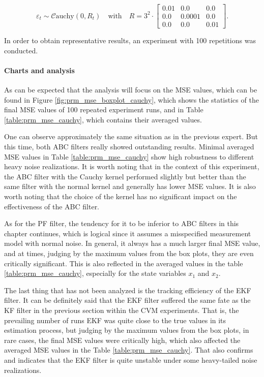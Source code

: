 \begin{equation}
    \varepsilon_t \sim \mathcal{C}\text{auchy}\left(0, R_t\right) \quad \text{with} \quad R =
    3^{2}\cdot
    \begin{bmatrix}
        0.01 & 0.0 & 0.0 \\
        0.0 & 0.0001 & 0.0 \\
        0.0 & 0.0 & 0.01
    \end{bmatrix}.
\end{equation}

In order to obtain representative results, an experiment with 100 repetitions was conducted.

\paragraph*{Charts and analysis}
As can be expected that the analysis will focus on the MSE values, which can be found in Figure \ref{fig:prm_mse_boxplot_cauchy}, which shows the statistics of the final MSE values of 100 repeated experiment runs, and in Table \ref{table:prm_mse_cauchy}, which contains their averaged values.

One can observe approximately the same situation as in the previous expert. But this time, both ABC filters really showed outstanding results. Minimal averaged MSE values in Table \ref{table:prm_mse_cauchy} show high robustness to different heavy noise realizations. It is worth noting that in the context of this experiment, the ABC filter with the Cauchy kernel performed slightly but better than the same filter with the normal kernel and generally has lower MSE values. It is also worth noting that the choice of the kernel has no significant impact on the effectiveness of the ABC filter.

As for the PF filter, the tendency for it to be inferior to ABC filters in this chapter continues, which is logical since it assumes a misspecified measurement model with normal noise. In general, it always has a much larger final MSE value, and at times, judging by the maximum values from the box plots, they are even critically significant. This is also reflected in the averaged values in the table \ref{table:prm_mse_cauchy}, especially for the state variables \(x_1\) and \(x_2\).

The last thing that has not been analyzed is the tracking efficiency of the EKF filter. It can be definitely said that the EKF filter suffered the same fate as the KF filter in the previous section within the CVM experiments.
That is, the prevailing number of runs EKF was quite close to the true values in its estimation process, but judging by the maximum values from the box plots, in rare cases, the final MSE values were critically high, which also affected the averaged MSE values in the Table \ref{table:prm_mse_cauchy}. That also confirms and indicates that the EKF filter is quite unstable under some heavy-tailed noise realizations.

